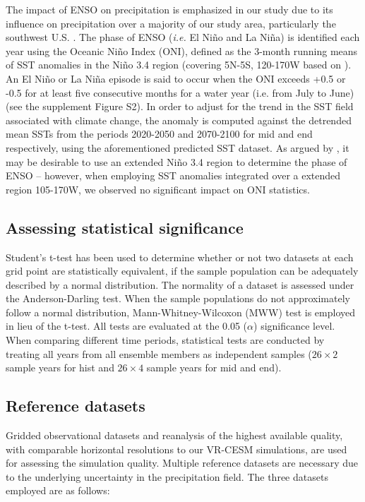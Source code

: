 The impact of ENSO on precipitation is emphasized in our study due to its influence on precipitation over a majority of our study area, particularly the southwest U.S. \cite{cayan1999enso, zhang2010influence, deser2012communication, yoon2015increasing}. The phase of ENSO (\textit{i.e.} El Ni\~no and La Ni\~na) is identified each year using the Oceanic Ni\~no Index (ONI), defined as the 3-month running means of SST anomalies in the Ni\~no 3.4 region (covering 5N-5S, 120-170W based on \cite{noaaElNino}). An El Ni\~no or La Ni\~na episode is said to occur when the ONI exceeds +0.5 or -0.5 for at least five consecutive months for a water year (i.e. from July to June) \cite{noaaElNino} (see the supplement Figure S2). In order to adjust for the trend in the SST field associated with climate change, the anomaly is computed against the detrended mean SSTs from the periods 2020-2050 and 2070-2100 for \textsf{mid} and \textsf{end} respectively, using the aforementioned predicted SST dataset. As argued by \cite{kao2009contrasting}, it may be desirable to use an extended Ni\~no 3.4 region to determine the phase of ENSO -- however, when employing SST anomalies integrated over a extended region 105-170W, we observed no significant impact on ONI statistics.


\subsection{Assessing statistical significance}

Student's t-test has been used to determine whether or not two datasets at each grid point are statistically equivalent, if the sample population can be adequately described by a normal distribution. The normality of a dataset is assessed under the Anderson-Darling test. When the sample populations do not approximately follow a normal distribution, Mann-Whitney-Wilcoxon (MWW) test is employed in lieu of the t-test. All tests are evaluated at the 0.05 ($\alpha$) significance level. When comparing different time periods, statistical tests are conducted by treating all years from all ensemble members as independent samples ($26 \times 2$ sample years for \textsf{hist} and $26 \times 4$ sample years for \textsf{mid} and \textsf{end}).


\subsection{Reference datasets}

Gridded observational datasets and reanalysis of the highest available quality, with comparable horizontal resolutions to our VR-CESM simulations, are used for assessing the simulation quality. Multiple reference datasets are necessary due to the underlying uncertainty in the precipitation field. The three datasets employed are as follows:

